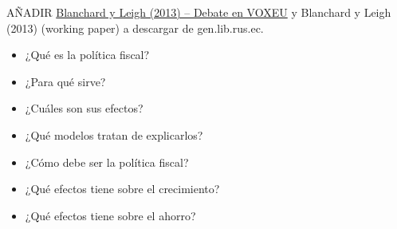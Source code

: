 \documentclass{nuevotema}
\begin{document}
\ideaclave

AÑADIR \href{https://voxeu.org/article/fiscal-consolidation-what-speed}{Blanchard y Leigh (2013) -- Debate en VOXEU} y Blanchard y Leigh (2013) (working paper) a descargar de gen.lib.rus.ec.


\begin{itemize}
	\item ¿Qué es la política fiscal?
	\item ¿Para qué sirve?
	\item ¿Cuáles son sus efectos?
	\item ¿Qué modelos tratan de explicarlos?
	\item ¿Cómo debe ser la política fiscal?
	\item ¿Qué efectos tiene sobre el crecimiento?
	\item ¿Qué efectos tiene sobre el ahorro?
\end{itemize}

\esquemacorto
\end{document}
